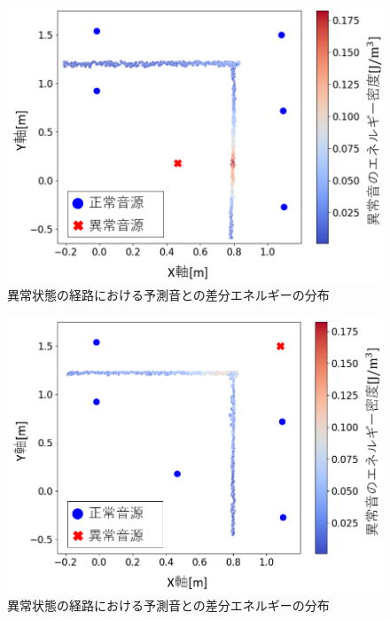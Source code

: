 \documentclass{/workdir/classes/summary}
\begin{document}
\begin{figure}[t]
  \centering
  \includegraphics[keepaspectratio, width=1.0\linewidth]{lab_abnormal2.png}
  \caption{異常状態の経路における予測音との差分エネルギーの分布}
  \label{fig:lab_abnormal2}
\end{figure}

\begin{figure}[t]
  \centering
  \includegraphics[keepaspectratio, width=1.0\linewidth]{lab_abnormal7.png}
  \caption{異常状態の経路における予測音との差分エネルギーの分布}
  \label{fig:lab_abnormal7}
\end{figure}
\end{document}
